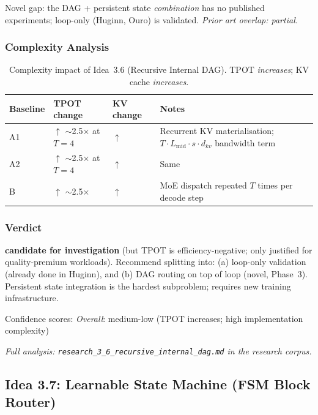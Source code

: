 \documentclass[11pt]{article}
\begin{document}
\noindent
Novel gap: the DAG + persistent state \emph{combination} has no published experiments; loop-only (Huginn, Ouro) is validated.
\emph{Prior art overlap: partial.}

\subsubsection*{Complexity Analysis}

\begin{table}[h]
\centering
\caption{Complexity impact of Idea~3.6 (Recursive Internal DAG).
TPOT \emph{increases}; KV cache \emph{increases}.}
\label{tab:complexity-3-6}
\begin{tabular}{lllp{7cm}}
\toprule
\textbf{Baseline} & \textbf{TPOT change} & \textbf{KV change} & \textbf{Notes} \\
\midrule
A1 & $\uparrow$ $\sim$2.5$\times$ at $T{=}4$ & $\uparrow$ & Recurrent KV materialisation; $T \cdot L_\text{mid} \cdot s \cdot d_{kv}$ bandwidth term \\
A2 & $\uparrow$ $\sim$2.5$\times$ at $T{=}4$ & $\uparrow$ & Same \\
B  & $\uparrow$ $\sim$2.5$\times$ & $\uparrow$ & MoE dispatch repeated $T$ times per decode step \\
\bottomrule
\end{tabular}
\end{table}

\subsubsection*{Verdict}
\textbf{candidate for investigation} (but TPOT is efficiency-negative; only justified for quality-premium workloads).
Recommend splitting into: (a) loop-only validation (already done in Huginn), and (b) DAG routing on top of loop (novel, Phase~3).
Persistent state integration is the hardest subproblem; requires new training infrastructure.

\noindent
Confidence scores:
\emph{Overall}: medium-low (TPOT increases; high implementation complexity)

\par\noindent\textit{Full analysis: \texttt{research\_3\_6\_recursive\_internal\_dag.md} in the research corpus.}

\subsection{Idea 3.7: Learnable State Machine (FSM Block Router)}
\label{subsec:idea-3-7}
\end{document}
